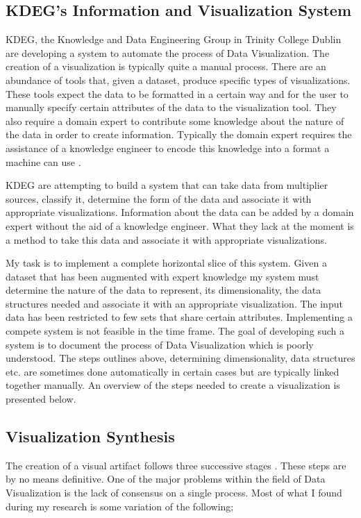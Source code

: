 \documentclass[a4paper, 10pt, titlepage, twocolumn, onehalfspace]{article}
\begin{document}
\subsection{KDEG's Information and Visualization System}
KDEG, the Knowledge and Data Engineering Group in Trinity College Dublin are developing a system to automate the process of Data Visualization. The creation of a visualization is typically quite a manual process. There are an abundance of tools that, given a dataset, produce specific types of visualizations. These tools expect the data to be formatted in a certain way and for the user to manually specify certain attributes of the data to the visualization tool. They also require a domain expert to contribute some knowledge about the nature of the data in order to create information. Typically the domain expert requires the assistance of a knowledge engineer to encode this knowledge into a format a machine can use \cite{champ}.

KDEG are attempting to build a system that can take data from multiplier sources, classify it, determine the form of the data and associate it with appropriate visualizations. Information about the data can be added by a domain expert without the aid of a knowledge engineer. What they lack at the moment is a method to take this data and associate it with appropriate visualizations.

My task is to implement a complete horizontal slice of this system. Given a dataset that has been augmented with expert knowledge my system must determine the nature of the data to represent, its dimensionality, the data structures needed and associate it with an appropriate visualization. The input data has been restricted to few sets that share certain attributes. Implementing a compete system is not feasible in the time frame. The goal of developing such a system is to document the process of Data Visualization which is poorly understood. The steps outlines above, determining dimensionality, data structures etc. are sometimes done automatically in certain cases but are typically linked together manually. An overview of the steps needed to create a visualization is presented below.

\subsection{Visualization Synthesis}
The creation of a visual artifact follows three successive stages \cite{mazza2009introduction}. These steps are by no means definitive. One of the major problems within the field of Data Visualization is the lack of consensus on a single process. Most of what I found during my research is some variation of the following;
\end{document}
